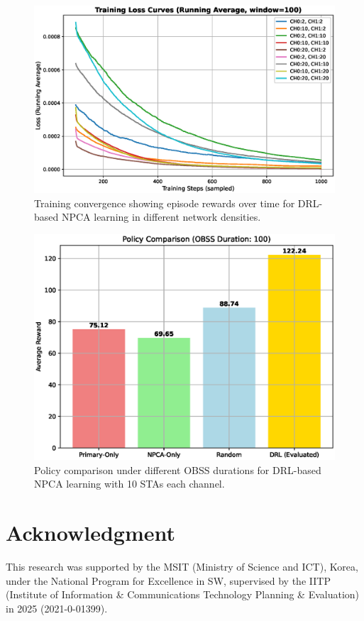 \documentclass[conference]{IEEEtran}
\begin{document}
\begin{figure}
\centerline{\includegraphics[width=\columnwidth]{figure/loss_curves_ax7.eps}}
\caption{Training convergence showing episode rewards over time for DRL-based NPCA learning in different network densities.}
\label{fig:training_convergence}
\end{figure}

\begin{figure}
\centerline{\includegraphics[width=\columnwidth]{figure/policy_comparison_obss_100.eps}}
\caption{Policy comparison under different OBSS durations for DRL-based NPCA learning with 10 STAs each channel.}
\label{fig:policy_comparison}
\end{figure}


\section*{Acknowledgment}

This research was supported by the MSIT (Ministry of Science and ICT), Korea, under the National Program for Excellence in SW, supervised by the IITP (Institute of Information \& Communications Technology Planning \& Evaluation) in 2025 (2021-0-01399).




\end{document}

